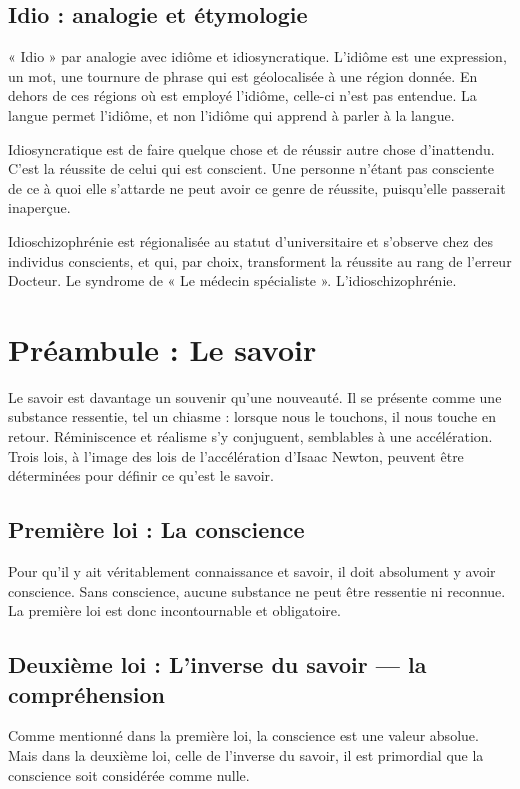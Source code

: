 \documentclass[12pt,oneside]{article}
\begin{document}
\subsection*{Idio : analogie et étymologie}

« Idio » par analogie avec idiôme et idiosyncratique. L'idiôme est une expression, un mot, une tournure de phrase qui est géolocalisée à une région donnée. En dehors de ces régions où est employé l'idiôme, celle-ci n'est pas entendue. La langue permet l'idiôme, et non l'idiôme qui apprend à parler à la langue.

Idiosyncratique est de faire quelque chose et de réussir autre chose d'inattendu. C'est la réussite de celui qui est conscient. Une personne n'étant pas consciente de ce à quoi elle s'attarde ne peut avoir ce genre de réussite, puisqu'elle passerait inaperçue.

Idioschizophrénie est régionalisée au statut d'universitaire et s'observe chez des individus conscients, et qui, par choix, transforment la réussite au rang de l'erreur Docteur. Le syndrome de « Le médecin spécialiste ». L'idioschizophrénie.

\section{Préambule : Le savoir}

Le savoir est davantage un souvenir qu'une nouveauté. Il se présente comme une substance ressentie, tel un chiasme : lorsque nous le touchons, il nous touche en retour. Réminiscence et réalisme s'y conjuguent, semblables à une accélération. Trois lois, à l'image des lois de l'accélération d'Isaac Newton, peuvent être déterminées pour définir ce qu'est le savoir.

\subsection{Première loi : La conscience}

Pour qu'il y ait véritablement connaissance et savoir, il doit absolument y avoir conscience. Sans conscience, aucune substance ne peut être ressentie ni reconnue. La première loi est donc incontournable et obligatoire.

\subsection{Deuxième loi : L'inverse du savoir --- la compréhension}

Comme mentionné dans la première loi, la conscience est une valeur absolue. Mais dans la deuxième loi, celle de l'inverse du savoir, il est primordial que la conscience soit considérée comme nulle.
\end{document}
